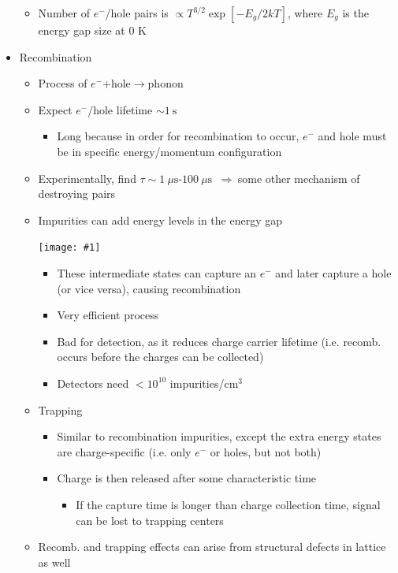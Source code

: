 \documentclass[11pt]{article}
\newcommand{\s}{\text{s}}
\newcommand{\mus}{\mu\text{s}}
\newcommand{\el}{\ensuremath{e^{-}}\xspace}
\newcommand{\thus}{$~\Rightarrow~$}
\newcommand{\embedimgw}[2]{\begin{center}\texttt{[image: \#1]}\end{center}}
\begin{document}
\begin{itemize}
\begin{itemize}
\begin{itemize}
    \end{itemize}
    \item Number of \el/hole pairs is $\propto T^{3/2}\exp \left[-E_g/2kT\right] $, where $E_g$ is the energy gap size at 0 K
  \end{itemize}
  \item Recombination
  \begin{itemize}
    \item Process of \el+hole$\rightarrow$phonon
    \item Expect \el/hole lifetime $\sim1~\s$
    \begin{itemize}
      \item Long because in order for recombination to occur, \el and hole must be in specific energy/momentum configuration
    \end{itemize}
    \item Experimentally, find $\tau\sim 1~\mus$-$100~\mus$ \thus some other mechanism of destroying pairs
    \item Impurities can add energy levels in the energy gap
    \embedimgw{figs/impurities.png}{.7}
    \begin{itemize}
      \item These intermediate states can capture an \el and later capture a hole (or vice versa), causing recombination
      \item Very efficient process
      \item Bad for detection, as it reduces charge carrier lifetime (i.e. recomb. occurs before the charges can be collected)
      \item Detectors need $<10^{10}$ impurities/cm$^3$
    \end{itemize}
    \item Trapping
    \begin{itemize}
      \item Similar to recombination impurities, except the extra energy states are charge-specific (i.e. only \el or holes, but not both)
      \item Charge is then released after some characteristic time
      \begin{itemize}
        \item If the capture time is longer than charge collection time, signal can be lost to trapping centers
      \end{itemize}
    \end{itemize}
    \item Recomb. and trapping effects can arise from structural defects in lattice as well
  \end{itemize}
\end{itemize}
\end{document}
